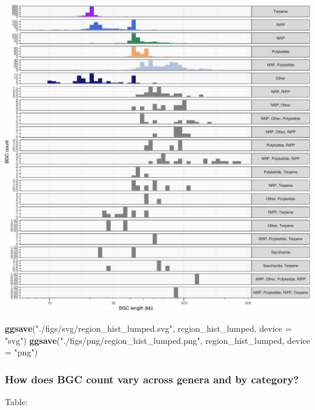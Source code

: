 \documentclass[
]{article}
\newenvironment{Shaded}{\begin{snugshade}}{\end{snugshade}}
\newcommand{\AttributeTok}[1]{\textcolor[rgb]{0.13,0.29,0.53}{#1}}
\newcommand{\FunctionTok}[1]{\textcolor[rgb]{0.13,0.29,0.53}{\textbf{#1}}}
\newcommand{\NormalTok}[1]{#1}
\newcommand{\StringTok}[1]{\textcolor[rgb]{0.31,0.60,0.02}{#1}}
\begin{document}
\includegraphics{analysis_files/figure-latex/unnamed-chunk-10-1.pdf}

\begin{Shaded}
\begin{Highlighting}[]
\FunctionTok{ggsave}\NormalTok{(}\StringTok{"./figs/svg/region\_hist\_lumped.svg"}\NormalTok{, region\_hist\_lumped, }\AttributeTok{device =} \StringTok{"svg"}\NormalTok{)}
\FunctionTok{ggsave}\NormalTok{(}\StringTok{"./figs/png/region\_hist\_lumped.png"}\NormalTok{, region\_hist\_lumped, }\AttributeTok{device =} \StringTok{"png"}\NormalTok{)}
\end{Highlighting}
\end{Shaded}

\hypertarget{how-does-bgc-count-vary-across-genera-and-by-category}{%
\subsubsection{How does BGC count vary across genera and by
category?}\label{how-does-bgc-count-vary-across-genera-and-by-category}}

Table:
\end{document}
